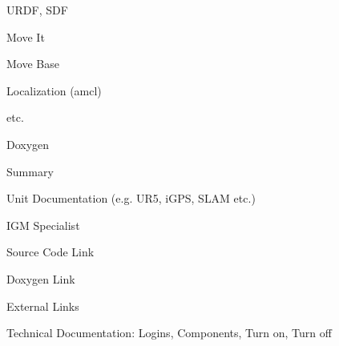 \begin{DoxyEnumerate}
\begin{DoxyEnumerate}
\begin{DoxyEnumerate}
\begin{DoxyEnumerate}
\item U\+R\+DF, S\+DF
\end{DoxyEnumerate}
\begin{DoxyEnumerate}
\item Move It
\end{DoxyEnumerate}
\begin{DoxyEnumerate}
\item Move Base
\end{DoxyEnumerate}
\begin{DoxyEnumerate}
\item Localization (amcl)
\end{DoxyEnumerate}
\begin{DoxyEnumerate}
\item etc.
\end{DoxyEnumerate}
\end{DoxyEnumerate}
\begin{DoxyEnumerate}
\item Doxygen
\end{DoxyEnumerate}
\begin{DoxyEnumerate}
\item Summary
\end{DoxyEnumerate}
\end{DoxyEnumerate}
\begin{DoxyEnumerate}
\item Unit Documentation (e.\+g. U\+R5, i\+G\+PS, S\+L\+AM etc.)
\begin{DoxyItemize}
\item I\+GM Specialist
\item Source Code Link
\item Doxygen Link
\item External Links
\item Technical Documentation\+: Logins, Components, Turn on, Turn off
\end{DoxyItemize}
\end{DoxyEnumerate}
\end{DoxyEnumerate}

